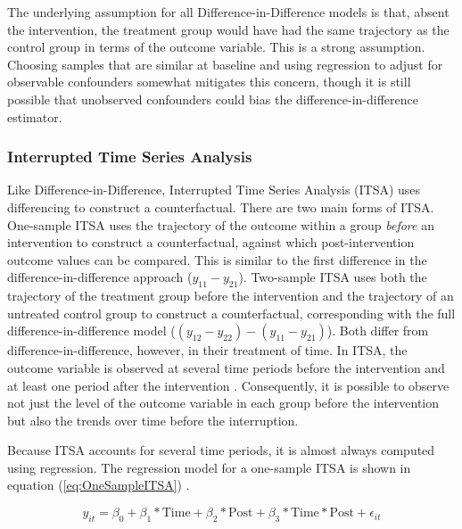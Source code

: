\documentclass[12pt]{article}
\begin{document}
The underlying assumption for all Difference-in-Difference models is that, absent the intervention, the treatment group would have had the same trajectory as the control group in terms of the outcome variable. This is a strong assumption. Choosing samples that are similar at baseline and using regression to adjust for observable confounders somewhat mitigates this concern, though it is still possible that unobserved confounders could bias the difference-in-difference estimator.

\subsubsection{Interrupted Time Series Analysis}

Like Difference-in-Difference, Interrupted Time Series Analysis (ITSA) uses differencing to construct a counterfactual. There are two main forms of ITSA. One-sample ITSA uses the trajectory of the outcome within a group \emph{before} an intervention to construct a counterfactual, against which post-intervention outcome values can be compared. This is similar to the first difference in the difference-in-difference approach ($y_{11}-y_{21}$). Two-sample ITSA uses both the trajectory of the treatment group before the intervention and the trajectory of an untreated control group to construct a counterfactual, corresponding with the full difference-in-difference model ($(y_{12} - y_{22}) - (y_{11}-y_{21})$). Both differ from difference-in-difference, however, in their treatment of time. In ITSA, the outcome variable is observed at several time periods before the intervention and at least one period after the intervention \citep{craigUsingNaturalExperiments2012}. Consequently, it is possible to observe not just the level of the outcome variable in each group before the intervention but also the trends over time before the interruption.

Because ITSA accounts for several time periods, it is almost always computed using regression. The regression model for a one-sample ITSA is shown in equation (\ref{eq:OneSampleITSA}) \citep{lopezbernalInterruptedTimeSeries2016}.

\begin{equation}\label{eq:OneSampleITSA}
  y_{it} = \beta_0 + \beta_1*\textrm{Time} + \beta_2*\textrm{Post} + \beta_3*\textrm{Time}*\textrm{Post} + \epsilon_{it}
\end{equation}
\end{document}
